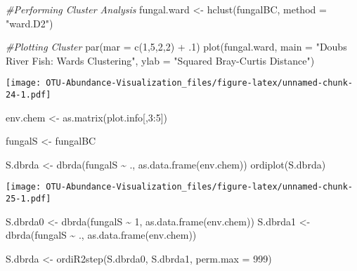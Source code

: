 \documentclass[
]{article}
\newenvironment{Shaded}{\begin{snugshade}}{\end{snugshade}}
\newcommand{\AttributeTok}[1]{\textcolor[rgb]{0.77,0.63,0.00}{#1}}
\newcommand{\CommentTok}[1]{\textcolor[rgb]{0.56,0.35,0.01}{\textit{#1}}}
\newcommand{\DecValTok}[1]{\textcolor[rgb]{0.00,0.00,0.81}{#1}}
\newcommand{\FunctionTok}[1]{\textcolor[rgb]{0.00,0.00,0.00}{#1}}
\newcommand{\NormalTok}[1]{#1}
\newcommand{\OtherTok}[1]{\textcolor[rgb]{0.56,0.35,0.01}{#1}}
\newcommand{\SpecialCharTok}[1]{\textcolor[rgb]{0.00,0.00,0.00}{#1}}
\newcommand{\StringTok}[1]{\textcolor[rgb]{0.31,0.60,0.02}{#1}}
\begin{document}
\begin{Shaded}
\begin{Highlighting}[]
\CommentTok{\#Performing Cluster Analysis}
\NormalTok{fungal.ward }\OtherTok{\textless{}{-}} \FunctionTok{hclust}\NormalTok{(fungalBC, }\AttributeTok{method =} \StringTok{"ward.D2"}\NormalTok{)}

\CommentTok{\#Plotting Cluster}
\FunctionTok{par}\NormalTok{(}\AttributeTok{mar =} \FunctionTok{c}\NormalTok{(}\DecValTok{1}\NormalTok{,}\DecValTok{5}\NormalTok{,}\DecValTok{2}\NormalTok{,}\DecValTok{2}\NormalTok{) }\SpecialCharTok{+}\NormalTok{ .}\DecValTok{1}\NormalTok{)}
\FunctionTok{plot}\NormalTok{(fungal.ward, }\AttributeTok{main =} \StringTok{"Doubs River Fish: Ward\textquotesingle{}s Clustering"}\NormalTok{,}
     \AttributeTok{ylab =} \StringTok{"Squared Bray{-}Curtis Distance"}\NormalTok{)}
\end{Highlighting}
\end{Shaded}

\texttt{[image: OTU-Abundance-Visualization\_files/figure-latex/unnamed-chunk-24-1.pdf]}

\begin{Shaded}
\begin{Highlighting}[]
\NormalTok{env.chem }\OtherTok{\textless{}{-}} \FunctionTok{as.matrix}\NormalTok{(plot.info[,}\DecValTok{3}\SpecialCharTok{:}\DecValTok{5}\NormalTok{])}

\NormalTok{fungalS }\OtherTok{\textless{}{-}}\NormalTok{ fungalBC}

\NormalTok{S.dbrda }\OtherTok{\textless{}{-}} \FunctionTok{dbrda}\NormalTok{(fungalS }\SpecialCharTok{\textasciitilde{}}\NormalTok{ ., }\FunctionTok{as.data.frame}\NormalTok{(env.chem))}
\FunctionTok{ordiplot}\NormalTok{(S.dbrda)}
\end{Highlighting}
\end{Shaded}

\texttt{[image: OTU-Abundance-Visualization\_files/figure-latex/unnamed-chunk-25-1.pdf]}

\begin{Shaded}
\begin{Highlighting}[]
\NormalTok{S.dbrda0 }\OtherTok{\textless{}{-}} \FunctionTok{dbrda}\NormalTok{(fungalS }\SpecialCharTok{\textasciitilde{}} \DecValTok{1}\NormalTok{, }\FunctionTok{as.data.frame}\NormalTok{(env.chem))}
\NormalTok{S.dbrda1 }\OtherTok{\textless{}{-}} \FunctionTok{dbrda}\NormalTok{(fungalS }\SpecialCharTok{\textasciitilde{}}\NormalTok{ ., }\FunctionTok{as.data.frame}\NormalTok{(env.chem))}

\NormalTok{S.dbrda }\OtherTok{\textless{}{-}} \FunctionTok{ordiR2step}\NormalTok{(S.dbrda0, S.dbrda1, }\AttributeTok{perm.max =} \DecValTok{999}\NormalTok{)}
\end{Highlighting}
\end{Shaded}
\end{document}
